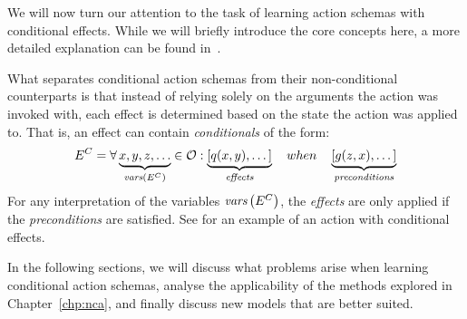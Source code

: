 \documentclass[../Master.tex]{subfiles}
\begin{document}
We will now turn our attention to the task of learning action schemas with conditional effects. While we will briefly introduce the core concepts here, a more detailed explanation can be found in~. 

What separates conditional action schemas from their non-conditional counterparts is that instead of relying solely on the arguments the action was invoked with, each effect is determined based on the state the action was applied to. That is, an effect can contain \emph{conditionals} of the form:
\begin{equation*}
    E^C = \forall \underbrace{x, y, z, \dots}_{\textit{vars} \left(E^C\right)}\in \mathcal{O} : 
    \underbrace{\left[ q(x, y), \dots \right]}_{\textit{effects}} \quad when \quad 
    \underbrace{\left[ g(z, x), \dots  \right]}_{\textit{preconditions}}
\end{equation*}
For any interpretation of the variables $\textit{vars}\left(E^C\right)$, the \textit{effects} are only applied if the \textit{preconditions} are satisfied. See  for an example of an action with conditional effects.

In the following sections, we will discuss what problems arise when learning conditional action schemas, analyse the applicability of the methods explored in Chapter~\ref{chp:nca}, and finally discuss new models that are better suited.


\end{document}
